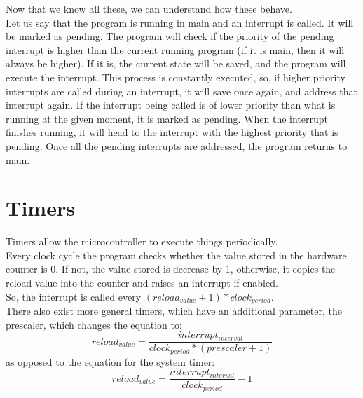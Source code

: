 \documentclass[nobib]{tufte-handout}
\begin{document}
Now that we know all these, we can understand how these behave.\\ Let us say
that the program is running in main and an interrupt is called. It will be
marked as pending. The program will check if the priority of the pending
interrupt is higher than the current running program (if it is main, then it
will always be higher). If it is, the current state will be saved, and the
program will execute the interrupt. This process is constantly executed, so, if
higher priority interrupts are called during an interrupt, it will save once
again, and address that interrupt again. If the interrupt being called is of
lower priority than what is running at the given moment, it is marked as
pending. When the interrupt finishes running, it will head to the interrupt
with the highest priority that is pending. Once all the pending interrupts are
addressed, the program returns to main.\\

\section{Timers}
Timers allow the microcontroller to execute things periodically.\\ Every clock
cycle the program checks whether the value stored in the hardware counter is 0.
If not, the value stored is decrease by 1, otherwise, it copies the reload
value into the counter and raises an interrupt if enabled.\\ So, the interrupt
is called every $(reload_{value}+1)*clock_{period}$.\\ There also exist more
general timers, which have an additional parameter, the prescaler, which
changes the equation to:
\begin{equation*}
    reload_{value} = \frac{interrupt_{interval}}{clock_{period}*(prescaler + 1)}
\end{equation*}
as opposed to the equation for the system timer:
\begin{equation*}
    reload_{value} = \frac{interrupt_{interval}}{clock_{period}}-1
\end{equation*}
\end{document}
